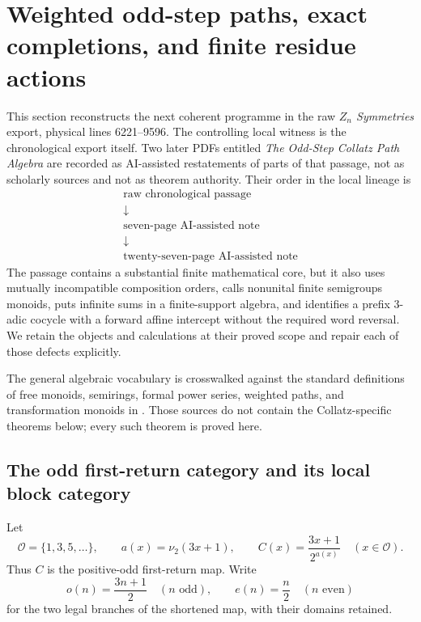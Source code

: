 \section{Weighted odd-step paths, exact completions, and finite residue actions}
\label{sec:chatnotes-weighted-path-algebra}

This section reconstructs the next coherent programme in the raw
\emph{$Z_n$ Symmetries} export, physical lines 6221--9596.  The controlling
local witness is the chronological export itself.  Two later PDFs entitled
\emph{The Odd-Step Collatz Path Algebra} are recorded as AI-assisted
restatements of parts of that passage, not as scholarly sources and not as
theorem authority.  Their order in the local lineage is
\[
 \begin{array}{c}
 \text{raw chronological passage}\\[-1mm]
 \downarrow\\[-1mm]
 \text{seven-page AI-assisted note}\\[-1mm]
 \downarrow\\[-1mm]
 \text{twenty-seven-page AI-assisted note}
 \end{array}
\]
The passage contains a substantial finite mathematical core, but it also
uses mutually incompatible composition orders, calls nonunital finite
semigroups monoids, puts infinite sums in a finite-support algebra, and
identifies a prefix $3$-adic cocycle with a forward affine intercept without
the required word reversal.  We retain the objects and calculations at their
proved scope and repair each of those defects explicitly.

The general algebraic vocabulary is crosswalked against the standard
definitions of free monoids, semirings, formal power series, weighted paths,
and transformation monoids in
\cite{KuichSalomaa1986,DrosteKuichVogler2009,Steinberg2016}.  Those sources do
not contain the Collatz-specific theorems below; every such theorem is proved
here.

\subsection{The odd first-return category and its local block category}

Let
\[
 \mathcal O=\{1,3,5,\ldots\},
 \qquad
 a(x)=\nu_2(3x+1),
 \qquad
 C(x)=\frac{3x+1}{2^{a(x)}}
 \quad(x\in\mathcal O).
\]
Thus $C$ is the positive-odd first-return map.  Write
\[
 o(n)=\frac{3n+1}{2}\quad(n\text{ odd}),
 \qquad
 e(n)=\frac n2\quad(n\text{ even})
\]
for the two legal branches of the shortened map, with their domains retained.

